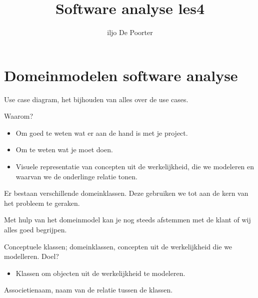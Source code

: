 \documentclass{article}
\author{iljo De Poorter}
\title{Software analyse les4}
\begin{document}
\maketitle
\section{Domeinmodelen software analyse}
Use case diagram, het bijhouden van alles over de use cases.

Waarom?
\begin{itemize}
\item Om goed te weten wat er aan de hand is met je project.
\item Om te weten wat je moet doen.
\item Visuele representatie van concepten uit de werkelijkheid, die we modeleren en waarvan we de onderlinge relatie tonen.
\end{itemize}
Er bestaan verschillende domeinklassen. Deze gebruiken we tot aan de kern van het probleem te geraken. 

Met hulp van het domeinmodel kan je nog steeds afstemmen met de klant of wij alles goed begrijpen.


Conceptuele klassen; domeinklassen, concepten uit de werkelijkheid die we modelleren.
Doel?
\begin{itemize}
\item Klassen om objecten uit de werkelijkheid te modeleren.
\end{itemize}


Associetienaam, naam van de relatie tussen de klassen.
\end{document}
